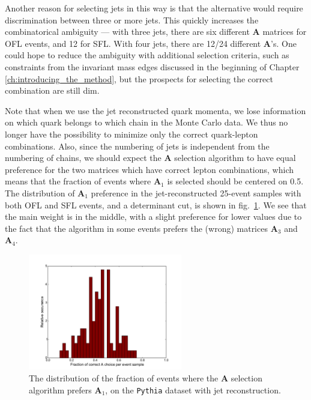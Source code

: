 \documentclass[twoside,english]{uiofysmaster}
\begin{document}
Another reason for selecting jets in this way is that the alternative would require discrimination between three or more jets. This quickly increases the combinatorical ambiguity --- with three jets, there are six different $\mathbf{A}$ matrices for OFL events, and 12 for SFL. With four jets, there are 12/24 different $\mathbf{A}$'s. One could hope to reduce the ambiguity with additional selection criteria, such as constraints from the invariant mass edges discussed in the beginning of Chapter \ref{ch:introducing_the_method}, but the prospects for selecting the correct combination are still dim.

Note that when we use the jet reconstructed quark momenta, we lose information on which quark belongs to which chain in the Monte Carlo data. We thus no longer have the possibility to minimize only the correct quark-lepton combinations. Also, since the numbering of jets is independent from the numbering of chains, we should expect the $\mathbf{A}$ selection algorithm to have equal preference for the two matrices which have correct lepton combinations, which means that the fraction of events where $\mathbf A_1$ is selected should be centered on 0.5. The distribution of $\mathbf A_1$ preference in the jet-reconstructed 25-event samples with both OFL and SFL events, and a determinant cut, is shown in fig.\ \ref{fig:histogram_jetrec_A1preference}. We see that the main weight is in the middle, with a slight preference for lower values due to the fact that the algorithm in some events prefers the (wrong) matrices $\mathbf A_3$ and $\mathbf A_4$.
\begin{figure}[hbt]
	\centering
	\includegraphics[width=0.6\textwidth]{figures/improving_combinatorics/histogram_jetrec_OSFL_25evbins_detAcut10.pdf} 
	\caption{The distribution of the fraction of events where the $\mathbf A$ selection algorithm prefers $\mathbf A_1$, on the {\tt Pythia} dataset with jet reconstruction.}
	\label{fig:histogram_jetrec_A1preference}
\end{figure}
\end{document}
